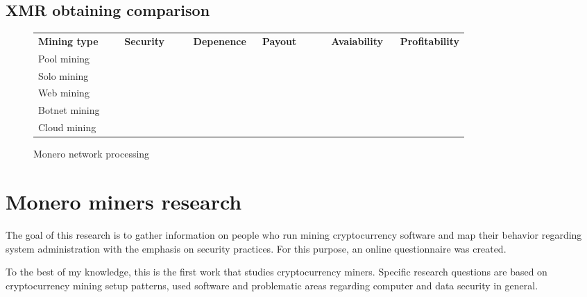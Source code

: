\documentclass[
  printed, %
  table,   %
  nolof,     %
  nolot,     %
           oneside, color
]{fithesis3}
\begin{document}
\section{XMR obtaining comparison}
\begin{figure}[H]
\center
\begin{tabular}{p{0.2\linewidth}p{0.16\linewidth}p{0.16\linewidth}p{0.16\linewidth}p{0.16\linewidth}p{0.16\linewidth}}
\textbf{Mining type} & \textbf{Security} & \textbf{Depenence} & \textbf{Payout} & \textbf{Avaiability} & \textbf{Profitability} \\
Pool mining          &                   &                    &                 &                      &                        \\
Solo mining          &                   &                    &                 &                      &                        \\
Web mining           &                   &                    &                 &                      &                        \\
Botnet mining        &                   &                    &                 &                      &                        \\
Cloud mining         &                   &                    &                 &                      &                       
\end{tabular}
\caption{Monero network processing}
\label{pict:network-processing}
\end{figure}
\fi
\chapter{Monero miners research}
The goal of this research is to gather information on people who run mining cryptocurrency software and map their behavior regarding system administration with the emphasis on security practices. For this purpose, an online questionnaire was created. 

To the best of my knowledge, this is the first work that studies cryptocurrency miners. Specific research questions are based on cryptocurrency mining setup patterns, used software and problematic areas regarding computer and data security in general. 
\end{document}
